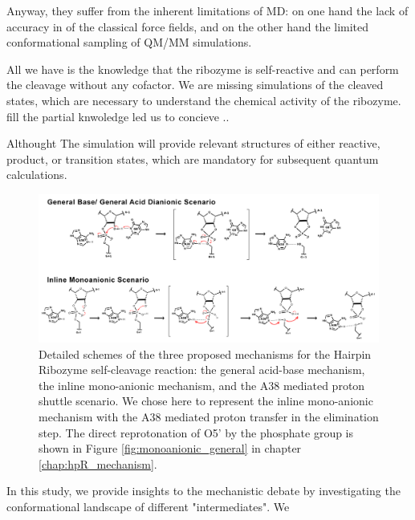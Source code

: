 \documentclass[journal=jacsat,manuscript=article]{achemso}
\begin{document}
Anyway, they suffer from the inherent limitations of MD: on one hand the lack of accuracy in of the classical force fields,
and on the other hand the limited conformational sampling of QM/MM simulations.





All we have is the knowledge that the ribozyme is self-reactive and can perform the cleavage without any cofactor. We are missing simulations of the cleaved states, which are necessary to understand the chemical activity of the ribozyme.
fill the partial knwoledge led us to concieve ..

Althought 
The simulation will provide relevant structures of either reactive, product, or transition states,
which are mandatory for subsequent quantum calculations.


\begin{figure}[h]
  \centering
  \includegraphics[width=\textwidth]{figures/All_mecanisms.png}
  \caption[Mechanistic Pathways of the Self-Cleavage]
  {Detailed schemes of the three proposed mechanisms for the Hairpin Ribozyme self-cleavage reaction:
  the general acid-base mechanism, the inline mono-anionic mechanism, and the A38 mediated proton shuttle scenario.
  We chose here to represent the inline mono-anionic mechanism with the A38 mediated proton transfer in the elimination step. 
  The direct reprotonation of O5' by the phosphate group is shown in Figure \ref{fig:monoanionic_general} in chapter \ref{chap:hpR_mechanism}.}
  \label{fig:all_mecas}
\end{figure}




In this study, we provide insights to the mechanistic debate by investigating the conformational landscape of different "intermediates".
We 
\end{document}
